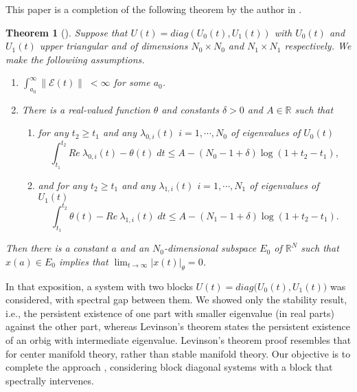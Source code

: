 \documentclass[a4paper,11pt]{article}
\newcommand{\E}{\mathcal{E}}
\newcounter{Theorem}
\newtheorem*{theorem*}{Theorem}
\theoremstyle{remark}
\begin{document}

This paper is a completion of the following theorem by the author in \cite[Theorem 1]{L19}.
\begin{theorem*}[\cite{L19}] \label{thm:2} Suppose that $U(t)=diag(U_0(t),U_1(t))$ with $U_0(t)$ and $U_1(t)$ upper triangular and of dimensions $N_0\times N_0$ and $N_1 \times N_1$ respectively. We make the followiing assumptions.
\begin{enumerate}
\item $\int_{a_0}^\infty \|\E(t)\| \; < \infty$ for some $a_0$.
\item There is a real-valued function $\theta$ and constants $\delta >0$ and $A\in \mathbb{R}$ such that
\begin{enumerate}
\item for any $t_2\ge t_1$ and any $\lambda_{0,i}(t)$ $i=1,\cdots,N_0$ of eigenvalues of $U_0(t)$ 
$$ \int_{t_1}^{t_2} Re\: \lambda_{0,i}(t) - \theta(t) \; dt \le A -(N_0 -1 +\delta)\log(1+t_2-t_1),$$
\item and for any $t_2\ge t_1$ and any $\lambda_{1,i}(t)$ $i=1,\cdots,N_1$ of eigenvalues of $U_1(t)$
$$ \int_{t_1}^{t_2} \theta(t)- Re\: \lambda_{1,i}(t) \; dt \le A -(N_1 -1 +\delta)\log(1+t_2-t_1).$$
\end{enumerate}
\end{enumerate}
Then there is a constant $a$ and an $N_0$-dimensional subspace $E_0$ of $ \mathbb{R}^N$ such that $x(a)\in E_0$ implies that $\displaystyle \lim_{t \rightarrow \infty}|x(t)|_\theta =0$. %
\end{theorem*}
In that exposition, a system with two blocks $U(t) = diag\big(U_0(t), U_1(t)\big)$ was considered, with spectral gap between them. We showed only the stability result, i.e., the persistent existence of one part with smaller eigenvalue (in real parts) against the other part, whereas Levinson's theorem states the persistent existence of an orbig with intermediate eigenvalue. Levinson's theorem proof resembles that for center manifold theory, rather than stable manifold theory. Our objective is to complete the approach \cite[Theorem1]{L19}, considering block diagonal systems with a block that spectrally intervenes. 
\end{document}

